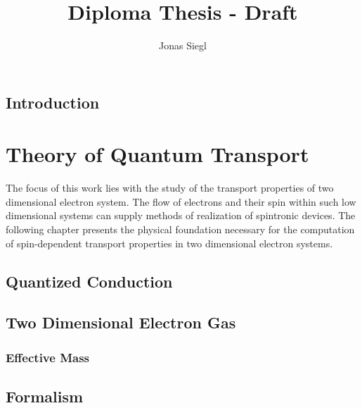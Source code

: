 
\author{Jonas Siegl}
\title{Diploma Thesis - Draft}




\maketitle
% 

\pagestyle{plain} %
\tableofcontents
\clearpage
\section*{Introduction}
\clearpage
\pagestyle{main}
\chapter{Theory of Quantum Transport}
The focus of this work lies with the study of the transport properties of two dimensional electron system. The flow of electrons and their spin within such low dimensional systems can supply methods of realization of spintronic devices.
 The following chapter presents the physical foundation necessary for the computation of spin-dependent transport properties in two dimensional electron systems.
  \section{Quantized Conduction}
  
  \section{Two Dimensional Electron Gas}
    
      \subsection{Effective Mass \hamil{}}
	
	
  \section{\cgfnc{} Formalism}
  
